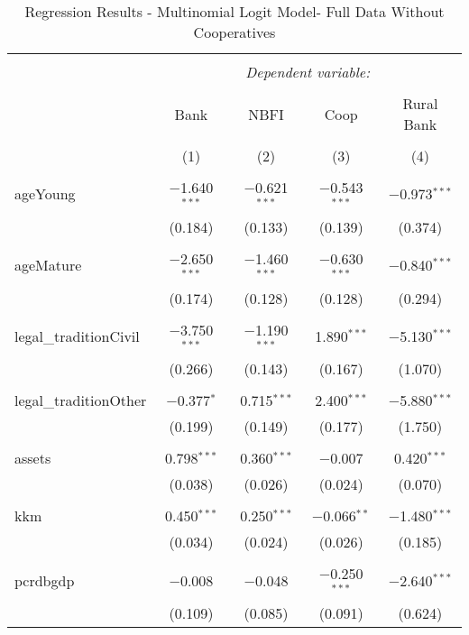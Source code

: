 \documentclass[a4paper,nobind]{templates/ociamthesis}
\begin{document}
\begin{table}[!htbp] \centering 
  \caption{Regression Results - Multinomial Logit Model- Full Data Without Cooperatives} 
  \label{} 
\footnotesize 
\begin{tabular}{@{\extracolsep{5pt}}lcccc} 
\\[-1.8ex]\hline 
\hline \\[-1.8ex] 
 & \multicolumn{4}{c}{\textit{Dependent variable:}} \\ 
\cline{2-5} 
\\[-1.8ex] & Bank & NBFI & Coop & Rural Bank \\ 
\\[-1.8ex] & (1) & (2) & (3) & (4)\\ 
\hline \\[-1.8ex] 
 ageYoung & $-$1.640$^{***}$ & $-$0.621$^{***}$ & $-$0.543$^{***}$ & $-$0.973$^{***}$ \\ 
  & (0.184) & (0.133) & (0.139) & (0.374) \\ 
  & & & & \\ 
 ageMature & $-$2.650$^{***}$ & $-$1.460$^{***}$ & $-$0.630$^{***}$ & $-$0.840$^{***}$ \\ 
  & (0.174) & (0.128) & (0.128) & (0.294) \\ 
  & & & & \\ 
 legal\_traditionCivil & $-$3.750$^{***}$ & $-$1.190$^{***}$ & 1.890$^{***}$ & $-$5.130$^{***}$ \\ 
  & (0.266) & (0.143) & (0.167) & (1.070) \\ 
  & & & & \\ 
 legal\_traditionOther & $-$0.377$^{*}$ & 0.715$^{***}$ & 2.400$^{***}$ & $-$5.880$^{***}$ \\ 
  & (0.199) & (0.149) & (0.177) & (1.750) \\ 
  & & & & \\ 
 assets & 0.798$^{***}$ & 0.360$^{***}$ & $-$0.007 & 0.420$^{***}$ \\ 
  & (0.038) & (0.026) & (0.024) & (0.070) \\ 
  & & & & \\ 
 kkm & 0.450$^{***}$ & 0.250$^{***}$ & $-$0.066$^{**}$ & $-$1.480$^{***}$ \\ 
  & (0.034) & (0.024) & (0.026) & (0.185) \\ 
  & & & & \\ 
 pcrdbgdp & $-$0.008 & $-$0.048 & $-$0.250$^{***}$ & $-$2.640$^{***}$ \\ 
  & (0.109) & (0.085) & (0.091) & (0.624) \\ 

\end{tabular}
\end{table}
\end{document}
